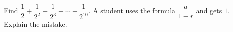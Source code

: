 Find $\dfrac{1}{2}+\dfrac{1}{2^2}+\dfrac{1}{2^3}+\cdots+\dfrac{1}{2^{10}}$. A student uses the formula $\dfrac{a}{1-r}$ and gets $1$. Explain the mistake.
